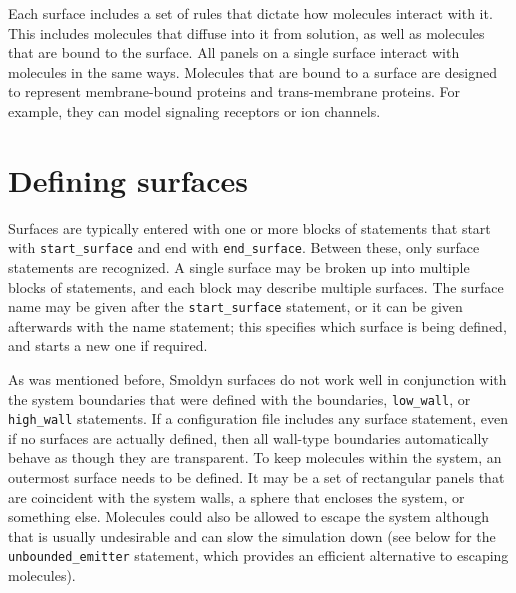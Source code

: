 \documentclass {scrbook}
\newcommand {\ttt} {\texttt}
\begin{document}
Each surface includes a set of rules that dictate how molecules interact with it. This includes molecules that diffuse into it from solution, as well as molecules that are bound to the surface. All panels on a single surface interact with molecules in the same ways. Molecules that are bound to a surface are designed to represent membrane-bound proteins and trans-membrane proteins. For example, they can model signaling receptors or ion channels.

\section{Defining surfaces}

Surfaces are typically entered with one or more blocks of statements that start with \ttt{start\_surface} and end with \ttt{end\_surface}. Between these, only surface statements are recognized. A single surface may be broken up into multiple blocks of statements, and each block may describe multiple surfaces. The surface name may be given after the \ttt{start\_surface} statement, or it can be given afterwards with the name statement; this specifies which surface is being defined, and starts a new one if required.

As was mentioned before, Smoldyn surfaces do not work well in conjunction with the system boundaries that were defined with the boundaries, \ttt{low\_wall}, or \ttt{high\_wall} statements. If a configuration file includes any surface statement, even if no surfaces are actually defined, then all wall-type boundaries automatically behave as though they are transparent. To keep molecules within the system, an outermost surface needs to be defined. It may be a set of rectangular panels that are coincident with the system walls, a sphere that encloses the system, or something else. Molecules could also be allowed to escape the system although that is usually undesirable and can slow the simulation down (see below for the \ttt{unbounded\_emitter} statement, which provides an efficient alternative to escaping molecules).
\end{document}
